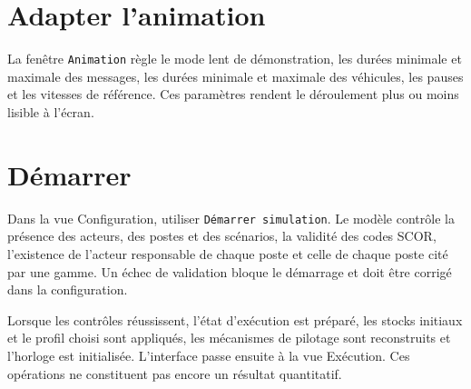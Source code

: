 

\section{Adapter l'animation}

La fenêtre \texttt{Animation} règle le mode lent de démonstration, les durées minimale et maximale des messages, les durées minimale et maximale des véhicules, les pauses et les vitesses de référence. Ces paramètres rendent le déroulement plus ou moins lisible à l'écran.



\section{Démarrer}

Dans la vue Configuration, utiliser \texttt{Démarrer simulation}. Le modèle contrôle la présence des acteurs, des postes et des scénarios, la validité des codes SCOR, l'existence de l'acteur responsable de chaque poste et celle de chaque poste cité par une gamme. Un échec de validation bloque le démarrage et doit être corrigé dans la configuration.

Lorsque les contrôles réussissent, l'état d'exécution est préparé, les stocks initiaux et le profil choisi sont appliqués, les mécanismes de pilotage sont reconstruits et l'horloge est initialisée. L'interface passe ensuite à la vue Exécution. Ces opérations ne constituent pas encore un résultat quantitatif.

